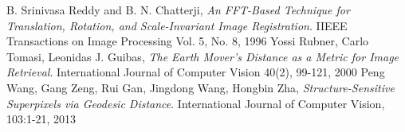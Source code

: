 \documentclass{article}
\begin{document}
\begin{thebibliography}{9}

	B. Srinivasa Reddy and B. N. Chatterji,
	\emph{An FFT-Based Technique for Translation, Rotation, and Scale-Invariant Image Registration}.
	IIEEE Transactions on Image Processing Vol. 5, No. 8, 1996
	Yossi Rubner, Carlo Tomasi, Leonidas J. Guibas,
	\emph{The Earth Mover's Distance as a Metric for Image Retrieval}.
	International Journal of Computer Vision 40(2), 99-121, 2000
	Peng Wang, Gang Zeng, Rui Gan, Jingdong Wang, Hongbin Zha,
	\emph{Structure-Sensitive Superpixels via Geodesic Distance}.
	International Journal of Computer Vision, 103:1-21, 2013

\end{thebibliography}
\end{document}
